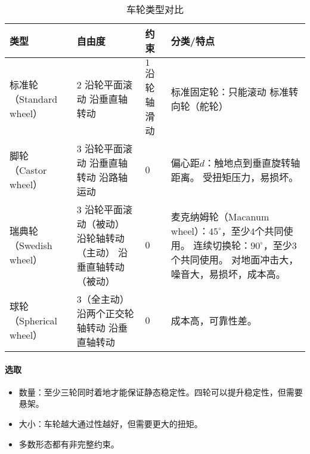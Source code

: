 \documentclass[
12pt, %
a4paper, 
oneside, %
headinclude,footinclude, %
]{scrartcl}
\begin{document}
\begin{table}[H]
\centering
\begin{tabular}{|p{2cm}|p{4.2cm}|p{2.2cm}|p{7cm}|}
\hline
类型 & 自由度 & 约束 & 分类/特点 \\
\hline
标准轮 \newline （Standard wheel） & $ 2 $ \newline 沿轮平面滚动 \newline 沿垂直轴转动 & $ 1 $ \newline 沿轮轴滑动 & 标准固定轮：只能滚动 \newline 标准转向轮（舵轮） \\
\hline
脚轮 \newline （Castor wheel） & $ 3 $ \newline 沿轮平面滚动 \newline 沿垂直轴转动 \newline 沿路轴运动 & $ 0 $ & 偏心距$ d $：触地点到垂直旋转轴距离。 \newline 受扭矩压力，易损坏。 \\
\hline
瑞典轮 \newline （Swedish wheel） & $ 3 $ \newline 沿轮平面滚动（被动） \newline 沿轮轴转动（主动） \newline 沿垂直轴转动（被动） & $ 0 $ & 麦克纳姆轮（Macanum wheel）：$ 45^\circ $，至少$ 4 $个共同使用。 \newline 连续切换轮：$ 90^\circ $，至少$ 3 $个共同使用。 \newline 对地面冲击大，噪音大，易损坏，成本高。 \\
\hline
球轮 \newline （Spherical wheel） & $ 3 $（全主动） \newline 沿两个正交轮轴转动 \newline 沿垂直轴转动 & $ 0 $ & 成本高，可靠性差。 \\
\hline
\end{tabular}
\caption{车轮类型对比}
\end{table}
\paragraph{选取}
\begin{itemize}
\item 数量：至少三轮同时着地才能保证静态稳定性。四轮可以提升稳定性，但需要悬架。
\item 大小：车轮越大通过性越好，但需要更大的扭矩。
\item 多数形态都有非完整约束。
\end{itemize}
\end{document}
